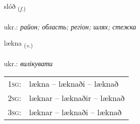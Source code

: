 \documentclass[frontgrid, backgrid]{flacards}\usepackage[]{graphicx}\usepackage[]{xcolor}
\begin{document}
\renewcommand{\blhead}{\vskip5pt {\small\bfseries\footnotesize Nafnorð | іменник }}
\renewcommand{\bcfoot}{\vskip5pt \hspace{2pt}{\small\bfseries\footnotesize 2K}}


{slóð \small{\textsubscript{(\textit{f.})}} \\[1ex] %
\textphonetic{[stlouːð]} \\
ukr.: \emph{район; область; регіон; шлях; стежка} \\  [2ex]
\renewcommand*{\arraystretch}{0.8}
}

\renewcommand{\flhead}{\vskip5pt \fboxsep=0pt {\small\bfseries\footnotesize Sagnorð | дієслово}}
\renewcommand{\fcfoot}{\vskip5pt \fboxsep=0pt \hspace{2pt}{\small\bfseries\footnotesize 2K}}

\renewcommand{\blhead}{\vskip5pt {\small\bfseries\footnotesize Sagnorð | дієслово }}
\renewcommand{\bcfoot}{\vskip5pt \hspace{2pt}{\small\bfseries\footnotesize 2K}}


{lækna \small{\textsubscript{(\textit{v.})}} \\[1ex] %
\textphonetic{[laihkna]} \\
ukr.: \emph{вилікувати} \\  [2ex]
\renewcommand*{\arraystretch}{0.8}
\begin{tabular}{p{1cm}l}
\textsc{1sg}: & lækna -- læknaði -- læknað \\ 
\textsc{2sg}: & læknar -- læknaðir -- læknað \\ 
\textsc{3sg}: & læknar -- læknaði -- læknað \\ 
\end{tabular}
}
\end{document}

